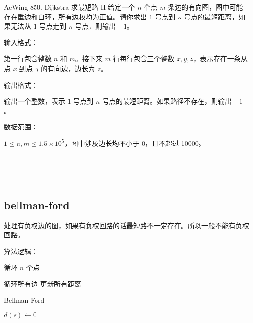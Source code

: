 \begin{titledbox}{AcWing 850. Dijkstra 求最短路 II}
    给定一个 $n$ 个点 $m$ 条边的有向图，图中可能存在重边和自环，所有边权均为正值。请你求出 $1$ 号点到 $n$ 号点的最短距离，如果无法从 $1$ 号点走到 $n$ 号点，则输出 $-1$。

    输入格式：

    第一行包含整数 $n$ 和 $m$。接下来 $m$ 行每行包含三个整数 $x,y,z$，表示存在一条从点 $x$ 到点 $y$ 的有向边，边长为 $z$。

    输出格式：

    输出一个整数，表示 $1$ 号点到 $n$ 号点的最短距离。如果路径不存在，则输出 $-1$。

    数据范围：

    $1 \le n, m \le 1.5 \times 10^5$，图中涉及边长均不小于 0，且不超过 10000。

    \begin{inputblock}
         \\
         \\
         \\
    \end{inputblock}
    \begin{outputblock}
    \end{outputblock}
\end{titledbox}

\subsection{bellman-ford}
处理有负权边的图，如果有负权回路的话最短路不一定存在。所以一般不能有负权回路。

算法逻辑：
\begin{myenum}
    \item 循环 $n$ 个点
    \item 循环所有边  更新所有距离
\end{myenum}

\begin{algorithm}[H] %
    \caption{Bellman-Ford}
    \SetAlgoLined
    $d(s) \leftarrow 0$\\
\end{algorithm}

